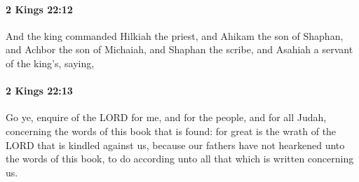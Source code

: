 		\paragraph{2 Kings 22:12} %
			\label{2KINGS-22-12}

			And the king commanded Hilkiah the priest, and Ahikam the son of Shaphan, and Achbor the son of Michaiah, and Shaphan the scribe, and Asahiah a servant of the king’s, saying,


		\paragraph{2 Kings 22:13} %
			\label{2KINGS-22-13}

			Go ye, enquire of the LORD for me, and for the people, and for all Judah, concerning the words of this book that is found: for great is the wrath of the LORD that is kindled against us, because our fathers have not hearkened unto the words of this book, to do according unto all that which is written concerning us.

